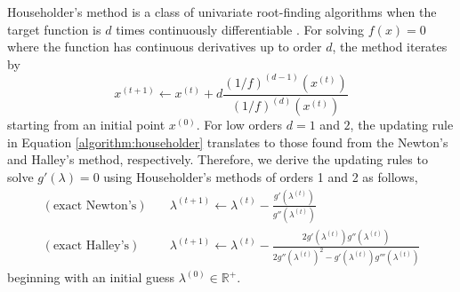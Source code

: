 \documentclass[11pt]{article}
\newcommand{\bbR}{\mathbb{R}}
\begin{document}
Householder's method is a class of univariate root-finding algorithms when the target function is $d$ times continuously differentiable \citep{householder_numerical_1970}. For solving $f(x)=0$ where the function has continuous derivatives up to order $d$, the method iterates by
\begin{equation}\label{algorithm:householder}
x^{(t+1)} \leftarrow  x^{(t)} + d \frac{(1/f)^{(d-1)} (x^{(t)})}{(1/f)^{(d)} (x^{(t)})}
\end{equation}
starting from an initial point $x^{(0)}$. For low orders $d=1$ and $2$, the updating rule in Equation \eqref{algorithm:householder} translates to those found from the Newton's and Halley's method, respectively. Therefore, we derive the updating rules to solve $g'(\lambda)=0$ using Householder's methods of orders 1 and 2 as follows,
\begin{subequations}\label{algorithm:householder_ordered}
\begin{align}
(\textrm{exact Newton's}) \quad&
\lambda^{(t+1)} \leftarrow  \lambda^{(t)} - \frac{g' (\lambda^{(t)})}{g'' (\lambda^{(t)})}  \label{algorithm:householder_newton}\\
(\textrm{exact Halley's}) \quad & \lambda^{(t+1)} \leftarrow \lambda^{(t)} - \frac{2g'(\lambda^{(t)}) g''(\lambda^{(t)})}{2 g'' (\lambda^{(t)})^2 - g'(\lambda^{(t)}) g'''(\lambda^{(t)})}  \label{algorithm:householder_halley}
\end{align}
\end{subequations}
beginning with an initial guess $\lambda^{(0)} \in \bbR^+$. 
\end{document}
